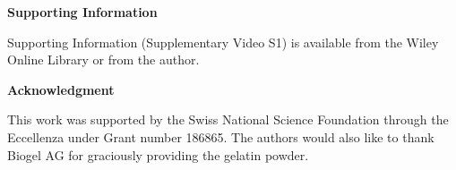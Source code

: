 \medskip
\textbf{Supporting Information} \par %
Supporting Information (Supplementary Video S1) is available from the Wiley Online Library or from the author.



\medskip
\textbf{Acknowledgment} \par %
This work was supported by the Swiss National Science Foundation through the Eccellenza under Grant number 186865. The authors would also like to thank Biogel AG for graciously providing the gelatin powder.
% 
\medskip

%

%







